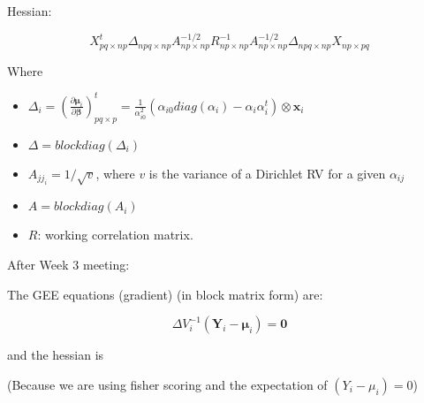 \documentclass[10pt]{article}
\theoremstyle{definition}
\begin{document}
Hessian:

$$X^t_{pq \times np} \Delta_{npq \times np} A^{-1/2}_{np \times np} R^{-1}_{np \times np} A^{-1/2}_{np \times np} \Delta_{npq \times np} X_{np \times pq}$$

Where

\begin{itemize}
  \item $\Delta_i = \left(\frac{\partial  \boldsymbol\mu_i }{\partial \boldsymbol\beta }\right)_{pq \times p}^t = \frac{1}{\alpha_{i0}^2}(\alpha_{i0}diag(\alpha_i) - \alpha_i\alpha_i^t) \otimes \mathbf{x}_i$
  \item $\Delta = block diag(\Delta_i)$
  \item $A_{{jj}_i} = 1/\sqrt{v}$, where $v$ is the variance of a Dirichlet RV for a given $\alpha_{ij}$
  \item $A = block diag(A_i)$
  \item $R$: working correlation matrix.
\end{itemize}


After Week 3 meeting:

The GEE equations (gradient) (in block matrix form) are:

$$\Delta V_i ^{-1} (\mathbf{Y}_i - \boldsymbol\mu_i) = \mathbf{0}$$

and the hessian is




(Because we are using fisher scoring and the expectation of $(Y_i - \mu_i) = 0$)
\end{document}
